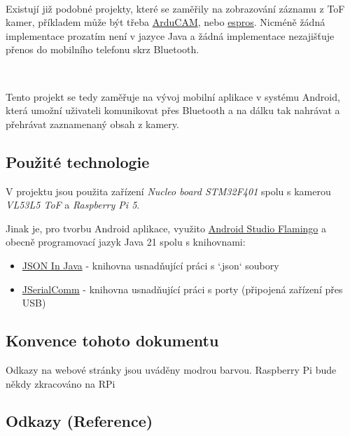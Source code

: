 \documentclass[12pt,a4paper]{article}
\begin{document}
$ $

Existují již podobné projekty, které se zaměřily na zobrazování záznamu z ToF kamer, příkladem může být třeba \href{https://github.com/ArduCAM/Arducam_tof_camera}{ArduCAM}, nebo \href{https://github.com/espros/epc-tofcam-toolkit}{espros}.
Nicméně žádná implementace prozatím není v jazyce Java a žádná implementace nezajišťuje přenos do mobilního telefonu skrz Bluetooth.

$ $

Tento projekt se tedy zaměřuje na vývoj mobilní aplikace v systému Android, která umožní uživateli komunikovat přes Bluetooth a na dálku tak nahrávat a přehrávat zaznamenaný obsah z kamery.

\subsection{Použité technologie}

V projektu jsou použita zařízení \textit{Nucleo board STM32F401} spolu s kamerou \textit{VL53L5 ToF} a \textit{Raspberry Pi 5}.

Jinak je, pro tvorbu Android aplikace, využito \href{https://developer.android.com/studio/releases/past-releases/as-flamingo-release-notes}{Android Studio Flamingo} a obecně programovací jazyk Java 21 spolu s knihovnami: \begin{itemize}
	\item \href{https://mvnrepository.com/artifact/org.json/json}{JSON In Java} - knihovna usnadňující práci s `.json` soubory
	\item \href{https://mvnrepository.com/artifact/com.fazecast/jSerialComm}{JSerialComm} - knihovna usnadňující práci s porty (připojená zařízení přes USB)
\end{itemize}

\subsection{Konvence tohoto dokumentu}
Odkazy na webové stránky jsou uváděny modrou barvou.
Raspberry Pi bude někdy zkracováno na RPi

\subsection{Odkazy (Reference)}
\end{document}
